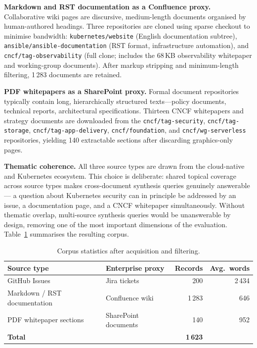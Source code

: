 \textbf{Markdown and RST documentation as a Confluence proxy.} Collaborative wiki pages are discursive, medium-length documents organised by human-authored headings. Three repositories are cloned using sparse checkout to minimise bandwidth: \texttt{kubernetes/website} (English documentation subtree), \texttt{ansible/ansible-documentation} (RST format, infrastructure automation), and \texttt{cncf/tag-observability} (full clone; includes the 68\,KB observability whitepaper and working-group documents). After markup stripping and minimum-length filtering, 1\,283 documents are retained.

\textbf{PDF whitepapers as a SharePoint proxy.} Formal document repositories typically contain long, hierarchically structured texts—policy documents, technical reports, architectural specifications. Thirteen CNCF whitepapers and strategy documents are downloaded from the \texttt{cncf/tag-security}, \texttt{cncf/tag-storage}, \texttt{cncf/tag-app-delivery}, \texttt{cncf/foundation}, and \texttt{cncf/wg-serverless} repositories, yielding 140 extractable sections after discarding graphics-only pages.

\textbf{Thematic coherence.} All three source types are drawn from the cloud-native and Kubernetes ecosystem. This choice is deliberate: shared topical coverage across source types makes cross-document synthesis queries genuinely answerable — a question about Kubernetes security can in principle be addressed by an issue, a documentation page, and a CNCF whitepaper simultaneously. Without thematic overlap, multi-source synthesis queries would be unanswerable by design, removing one of the most important dimensions of the evaluation. Table~\ref{tab:corpus} summarises the resulting corpus.

\begin{table}[ht]
\centering
\small
\setlength{\tabcolsep}{4pt}
\caption{Corpus statistics after acquisition and filtering.}
\label{tab:corpus}
\begin{tabular}{p{5.0cm}p{3.5cm}rr}
\hline
\textbf{Source type} & \textbf{Enterprise proxy} & \textbf{Records} & \textbf{Avg.\ words} \\
\hline
GitHub Issues & Jira tickets & 200 & 2\,434 \\
Markdown / RST documentation & Confluence wiki & 1\,283 & 646 \\
PDF whitepaper sections & SharePoint documents & 140 & 952 \\
\hline
\textbf{Total} & & \textbf{1\,623} & \\
\hline
\end{tabular}
\end{table}

